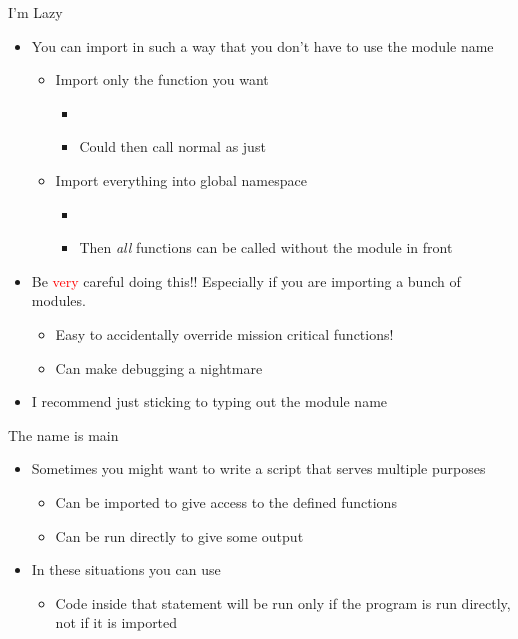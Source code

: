 \documentclass[pdf, aspectratio=169, 12pt]{beamer}
\begin{document}
\begin{frame}{I'm Lazy}
	\begin{itemize}
		\item You can import in such a way that you don't have to use the module name
			\begin{itemize}
				\item Import only the function you want
					\begin{itemize}
						\item {}
						\item Could then call normal as just 
					\end{itemize}
				\item Import everything into global namespace
					\begin{itemize}
						\item {}
						\item Then \emph{all} functions can be called without the module in front
					\end{itemize}
			\end{itemize}
		\item Be \textcolor{Red}{very} careful doing this!! Especially if you are importing a bunch of modules.
			\begin{itemize}
				\item Easy to accidentally override mission critical functions!
				\item Can make debugging a nightmare
			\end{itemize}
		\item I recommend just sticking to typing out the module name
	\end{itemize}
\end{frame}

\begin{frame}{The name is main}
	\begin{itemize}
		\item Sometimes you might want to write a script that serves multiple purposes
			\begin{itemize}
				\item Can be imported to give access to the defined functions
				\item Can be run directly to give some output
			\end{itemize}
		\item In these situations you can use
			\begin{center}
			\end{center}
			\begin{itemize}
				\item Code inside that  statement will be run \alert{only} if the program is run directly, \alert{not} if it is imported
			\end{itemize}
	\end{itemize}
\end{frame}
\end{document}
